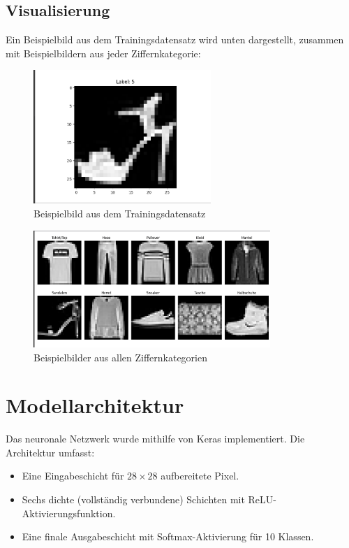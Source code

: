 \documentclass[12pt,a4paper]{article}
\begin{document}
\subsection*{Visualisierung}
Ein Beispielbild aus dem Trainingsdatensatz wird unten dargestellt, zusammen mit Beispielbildern aus jeder Ziffernkategorie:

\begin{figure}[h!]
    \centering
    \includegraphics[width=0.6\textwidth]{image-1.png}
    \caption{Beispielbild aus dem Trainingsdatensatz}
    \label{fig:example-image}
\end{figure}

\begin{figure}[h!]
    \centering
    \includegraphics[width=0.8\textwidth]{image-2.png}
    \caption{Beispielbilder aus allen Ziffernkategorien}
    \label{fig:sample-images}
\end{figure}

\newpage

\section*{Modellarchitektur}
Das neuronale Netzwerk wurde mithilfe von Keras implementiert. Die Architektur umfasst:
\begin{itemize}
    \item Eine Eingabeschicht für $28 \times 28$ aufbereitete Pixel.
    \item Sechs dichte (vollständig verbundene) Schichten mit ReLU-Aktivierungsfunktion.
    \item Eine finale Ausgabeschicht mit Softmax-Aktivierung für 10 Klassen.
\end{itemize}
\end{document}
